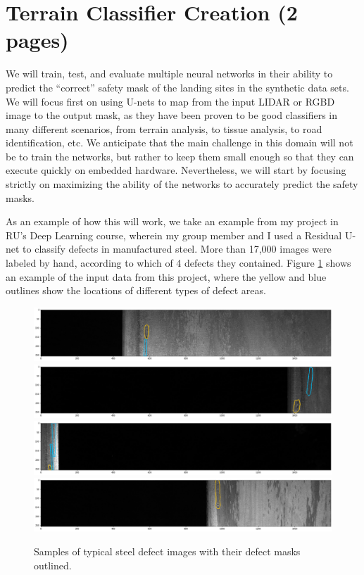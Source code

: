 \section{Terrain Classifier Creation (2 pages)}

We will train, test, and evaluate multiple neural networks in their ability to predict the
``correct'' safety mask of the landing sites in the synthetic data sets.
We will focus first on using U-nets to map from the input LIDAR or RGBD image
to the output mask, as they have been proven to be good classifiers in many different scenarios,
from terrain analysis, to tissue analysis, to road identification, etc.
We anticipate that the main challenge in this domain will not be
to train the networks, but rather to keep them small enough
so that they can execute quickly on embedded hardware.
Nevertheless, we will start by focusing strictly on maximizing the ability of the networks
to accurately predict the safety masks.

As an example of how this will work, we take an example from my project in RU's Deep Learning
course, wherein my group member and I used a Residual U-net to classify defects
in manufactured steel.
More than 17,000 images were labeled by hand, according to which of 4 defects they contained.
Figure \ref{figure:steel_defect_images} shows an example of the input data from this project,
where the yellow and blue outlines show the locations of different types of defect areas.

\begin{figure}
    \centering
    \includegraphics[width=\textwidth]{images/masked_image_1.png}
    \includegraphics[width=\textwidth]{images/masked_image_2.png}
    \includegraphics[width=\textwidth]{images/masked_image_3.png}
    \includegraphics[width=\textwidth]{images/masked_image_4.png}
    \caption{Samples of typical steel defect images with their defect masks outlined.}
    \label{figure:steel_defect_images}
\end{figure}

